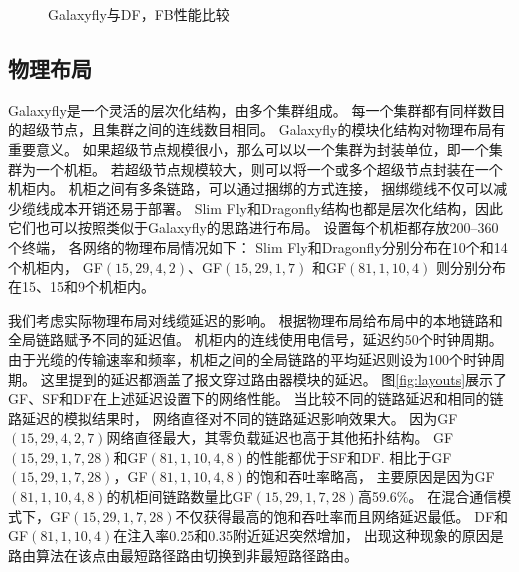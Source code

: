 \begin{figure}
  \centering
  \begin{minipage}[t]{\textwidth}
    \centering
    \caption{Galaxyfly与DF，FB性能比较}
    \label{fig:gfsfdf}
  \end{minipage}
\end{figure}

\subsection{物理布局}

Galaxyfly是一个灵活的层次化结构，由多个集群组成。
每一个集群都有同样数目的超级节点，且集群之间的连线数目相同。
Galaxyfly的模块化结构对物理布局有重要意义。
如果超级节点规模很小，那么可以以一个集群为封装单位，即一个集群为一个机柜。
若超级节点规模较大，则可以将一个或多个超级节点封装在一个机柜内。
机柜之间有多条链路，可以通过捆绑的方式连接，
捆绑缆线不仅可以减少缆线成本开销还易于部署。
Slim Fly和Dragonfly结构也都是层次化结构，因此它们也可以按照类似于Galaxyfly的思路进行布局。
设置每个机柜都存放200--360个终端，
各网络的物理布局情况如下：
Slim Fly和Dragonfly分别分布在10个和14个机柜内，
GF$(15,29,4,2)$、GF$(15,29,1,7)$ 和GF$(81,1,10,4)$
则分别分布在15、15和9个机柜内。

我们考虑实际物理布局对线缆延迟的影响。
根据物理布局给布局中的本地链路和全局链路赋予不同的延迟值。
机柜内的连线使用电信号，延迟约50个时钟周期。
由于光缆的传输速率和频率，机柜之间的全局链路的平均延迟则设为100个时钟周期。
这里提到的延迟都涵盖了报文穿过路由器模块的延迟。
图\ref{fig:layouts}展示了GF、SF和DF在上述延迟设置下的网络性能。
当比较不同的链路延迟和相同的链路延迟的模拟结果时，
网络直径对不同的链路延迟影响效果大。
因为GF$(15,29,4,2,7)$网络直径最大，其零负载延迟也高于其他拓扑结构。
GF$(15,29,1,7,28)$和GF$(81,1,10,4,8)$的性能都优于SF和DF.
相比于GF$(15,29,1,7,28)$，GF$(81,1,10,4,8)$的饱和吞吐率略高，
主要原因是因为GF$(81,1,10,4,8)$的机柜间链路数量比GF$(15,29,1,7,28)$高59.6\%。
在混合通信模式下，GF$(15,29,1,7,28)$不仅获得最高的饱和吞吐率而且网络延迟最低。
DF和GF$(81,1,10,4)$在注入率0.25和0.35附近延迟突然增加，
出现这种现象的原因是路由算法在该点由最短路径路由切换到非最短路径路由。


